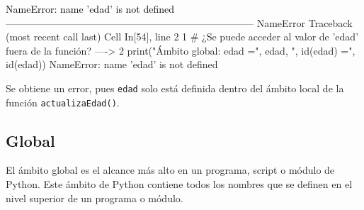 \documentclass[
  spanish,
  letterpaper,
]{scrbook}
\theoremstyle{definition}
\theoremstyle{remark}
\begin{document}
\begin{Highlighting}
\textcolor{black}{NameError: name 'edad' is not defined}
\textcolor{black}{}\textcolor{QuartoInternalColor1}{---------------------------------------------------------------------------}\textcolor{QuartoInternalColor2}{}
\textcolor{QuartoInternalColor2}{}\textcolor{QuartoInternalColor1}{NameError}\textcolor{QuartoInternalColor2}{                                 Traceback (most recent call last)}
\textcolor{QuartoInternalColor2}{}\textcolor{QuartoInternalColor3}{Cell}\textcolor{QuartoInternalColor2}{}\textcolor{QuartoInternalColor3}{ }\textcolor{QuartoInternalColor2}{}\textcolor{QuartoInternalColor4}{In[54]}\textcolor{QuartoInternalColor2}{}\textcolor{QuartoInternalColor4}{, line 2}\textcolor{QuartoInternalColor2}{}
\textcolor{QuartoInternalColor2}{}\textcolor{QuartoInternalColor4}{      1}\textcolor{QuartoInternalColor2}{ }\textcolor{QuartoInternalColor9}{# ¿Se puede acceder al valor de 'edad' fuera de la función?}\textcolor{QuartoInternalColor2}{}
\textcolor{QuartoInternalColor2}{}\textcolor{QuartoInternalColor4}{----> }\textcolor{QuartoInternalColor2}{}\textcolor{QuartoInternalColor4}{2}\textcolor{QuartoInternalColor2}{ }\textcolor{QuartoInternalColor5}{print}\textcolor{QuartoInternalColor2}{(}\textcolor{QuartoInternalColor6}{"}\textcolor{QuartoInternalColor2}{}\textcolor{QuartoInternalColor6}{Ámbito global: edad =}\textcolor{QuartoInternalColor2}{}\textcolor{QuartoInternalColor6}{"}\textcolor{QuartoInternalColor2}{, }\textcolor{QuartoInternalColor2}{edad}\textcolor{QuartoInternalColor2}{, }\textcolor{QuartoInternalColor6}{"}\textcolor{QuartoInternalColor2}{}\textcolor{QuartoInternalColor6}{, id(edad) =}\textcolor{QuartoInternalColor2}{}\textcolor{QuartoInternalColor6}{"}\textcolor{QuartoInternalColor2}{, }\textcolor{QuartoInternalColor5}{id}\textcolor{QuartoInternalColor2}{(edad))}
\textcolor{QuartoInternalColor2}{}\textcolor{QuartoInternalColor1}{NameError}\textcolor{QuartoInternalColor2}{: name 'edad' is not defined}
\end{Highlighting}

Se obtiene un error, pues \texttt{edad} solo está definida dentro del
ámbito local de la función \texttt{actualizaEdad()}.

\subsection{Global}\label{global}

El ámbito global es el alcance más alto en un programa, script o módulo
de Python. Este ámbito de Python contiene todos los nombres que se
definen en el nivel superior de un programa o módulo.
\end{document}
